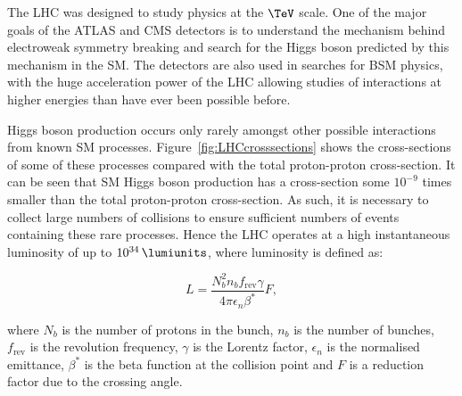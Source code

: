 The LHC was designed to study physics at the $\TeV$ scale. One of the major
goals of the ATLAS and CMS detectors is to understand the mechanism behind
electroweak symmetry breaking and search for the Higgs boson predicted by this
mechanism in the \ac{SM}. The detectors are also used in searches for \ac{BSM}
physics, with the huge acceleration power of the LHC allowing studies of 
interactions at higher energies than have ever been possible before. 

Higgs boson production occurs only rarely amongst other possible interactions from known
\ac{SM} processes. Figure~\ref{fig:LHCcrosssections} shows the cross-sections of
some of these processes compared with the total proton-proton cross-section. It can be
seen that \ac{SM} Higgs boson production has a cross-section some $10^{-9}$ times
smaller than the total proton-proton cross-section. 
As such, it is necessary to collect large numbers of
collisions to ensure sufficient numbers of events containing these rare
processes. Hence the LHC operates at a high instantaneous luminosity of up to
$10^{34}\,\lumiunits$, where luminosity is defined as:

\begin{equation}
L=\frac{N_{b}^{2}n_{b}f_{\text{rev}}\gamma}{4\pi\epsilon_{n}\beta^{*}}F,
\end{equation}

where $N_{b}$ is the number of protons in the bunch, $n_{b}$ is the number of
bunches, $f_\text{rev}$ is the revolution frequency, $\gamma$ is the Lorentz
factor, $\epsilon_{n}$ is the normalised emittance, $\beta^{*}$ is the beta
function at the collision point and $F$ is a reduction factor due to the
crossing angle.

